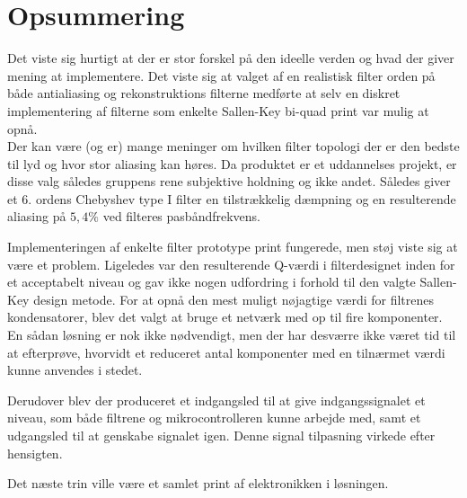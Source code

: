 \section{Opsummering}

Det viste sig hurtigt at der er stor forskel på den ideelle verden og hvad der giver mening at implementere.
Det viste sig at valget af en realistisk filter orden på både antialiasing og rekonstruktions filterne medførte at selv en diskret implementering af filterne som enkelte Sallen-Key bi-quad print var mulig at opnå.
\\
Der kan være (og er) mange meninger om hvilken filter topologi der er den bedste til lyd og hvor stor aliasing kan høres.
Da produktet er et uddannelses projekt, er disse valg således gruppens rene subjektive holdning og ikke andet.
Således giver et 6. ordens Chebyshev type I filter en tilstrækkelig dæmpning og en resulterende aliasing på  $5,4\si\percent$ ved filteres pasbåndfrekvens. 

Implementeringen af enkelte filter prototype print fungerede, men støj viste sig at være et problem.
Ligeledes var den resulterende Q-værdi i filterdesignet inden for et acceptabelt niveau og gav ikke nogen udfordring i forhold til den valgte Sallen-Key design metode. 
For at opnå den mest muligt nøjagtige værdi for filtrenes kondensatorer, blev det valgt at bruge et netværk med op til fire komponenter.
En sådan løsning er nok ikke nødvendigt, men der har desværre ikke været tid til at efterprøve, hvorvidt et reduceret antal komponenter med en tilnærmet værdi kunne anvendes i stedet. %

Derudover blev der produceret et indgangsled til at give indgangssignalet et niveau, som både filtrene og mikrocontrolleren kunne arbejde med, samt et udgangsled til at genskabe signalet igen.
Denne signal tilpasning virkede efter hensigten.

Det næste trin ville være et samlet print af elektronikken i løsningen.